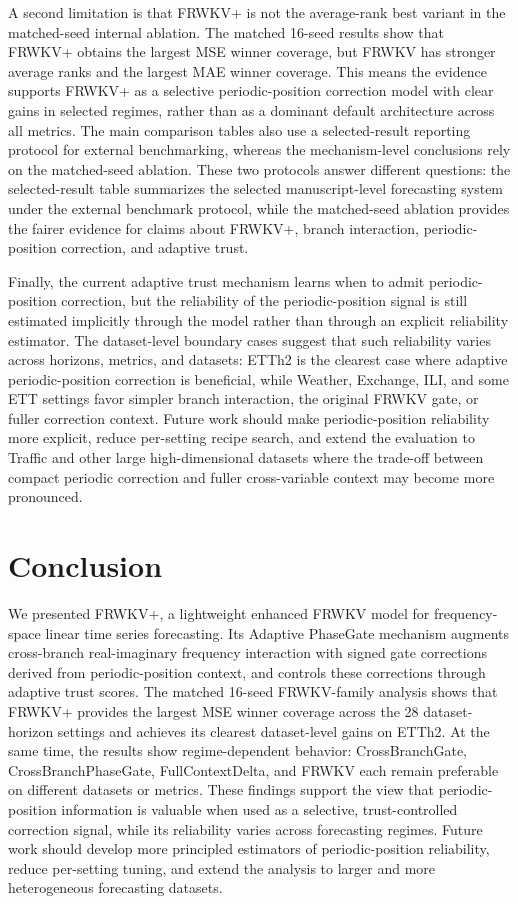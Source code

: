 \documentclass[a4paper,fleqn]{cas-sc}
\begin{document}
A second limitation is that FRWKV+ is not the average-rank best variant in the matched-seed internal ablation. The matched 16-seed results show that FRWKV+ obtains the largest MSE winner coverage, but FRWKV has stronger average ranks and the largest MAE winner coverage. This means the evidence supports FRWKV+ as a selective periodic-position correction model with clear gains in selected regimes, rather than as a dominant default architecture across all metrics. The main comparison tables also use a selected-result reporting protocol for external benchmarking, whereas the mechanism-level conclusions rely on the matched-seed ablation. These two protocols answer different questions: the selected-result table summarizes the selected manuscript-level forecasting system under the external benchmark protocol, while the matched-seed ablation provides the fairer evidence for claims about FRWKV+, branch interaction, periodic-position correction, and adaptive trust.

Finally, the current adaptive trust mechanism learns when to admit periodic-position correction, but the reliability of the periodic-position signal is still estimated implicitly through the model rather than through an explicit reliability estimator. The dataset-level boundary cases suggest that such reliability varies across horizons, metrics, and datasets: ETTh2 is the clearest case where adaptive periodic-position correction is beneficial, while Weather, Exchange, ILI, and some ETT settings favor simpler branch interaction, the original FRWKV gate, or fuller correction context. Future work should make periodic-position reliability more explicit, reduce per-setting recipe search, and extend the evaluation to Traffic and other large high-dimensional datasets where the trade-off between compact periodic correction and fuller cross-variable context may become more pronounced.

\section{Conclusion}
We presented FRWKV+, a lightweight enhanced FRWKV model for frequency-space linear time series forecasting. Its Adaptive PhaseGate mechanism augments cross-branch real-imaginary frequency interaction with signed gate corrections derived from periodic-position context, and controls these corrections through adaptive trust scores. The matched 16-seed FRWKV-family analysis shows that FRWKV+ provides the largest MSE winner coverage across the 28 dataset-horizon settings and achieves its clearest dataset-level gains on ETTh2. At the same time, the results show regime-dependent behavior: CrossBranchGate, CrossBranchPhaseGate, FullContextDelta, and FRWKV each remain preferable on different datasets or metrics. These findings support the view that periodic-position information is valuable when used as a selective, trust-controlled correction signal, while its reliability varies across forecasting regimes. Future work should develop more principled estimators of periodic-position reliability, reduce per-setting tuning, and extend the analysis to larger and more heterogeneous forecasting datasets.
\end{document}
